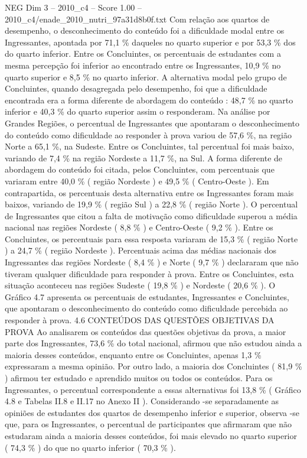 \begin{textsample}{NEG Dim 3 – 2010\_c4 – Score 1.00 – 2010\_c4/enade\_2010\_nutri\_97a31d8b0f.txt}
Com relação aos quartos de desempenho, o desconhecimento do conteúdo foi a dificuldade modal entre os Ingressantes, apontada por 71,1 \% daqueles no quarto superior e por 53,3 \% dos do quarto inferior.
Entre os Concluintes, os percentuais de estudantes com a mesma percepção foi inferior ao encontrado entre os Ingressantes, 10,9 \% no quarto superior e 8,5 \% no quarto inferior.
A alternativa modal pelo grupo de Concluintes, quando desagregada pelo desempenho, foi que a dificuldade encontrada era a forma diferente de abordagem do conteúdo : 48,7 \% no quarto inferior e 40,3 \% do quarto superior assim o responderam.
Na análise por Grandes Regiões, o percentual de Ingressantes que apontaram o desconhecimento do conteúdo como dificuldade ao responder à prova variou de 57,6 \%, na região Norte a 65,1 \%, na Sudeste.
Entre os Concluintes, tal percentual foi mais baixo, variando de 7,4 \% na região Nordeste a 11,7 \%, na Sul.
A forma diferente de abordagem do conteúdo foi citada, pelos Concluintes, com percentuais que variaram entre 40,0 \% ( região Nordeste ) e 49,5 \% ( Centro-Oeste ).
Em contrapartida, os percentuais desta alternativa entre os Ingressantes foram mais baixos, variando de 19,9 \% ( região Sul ) a 22,8 \% ( região Norte ).
O percentual de Ingressantes que citou a falta de motivação como dificuldade superou a média nacional nas regiões Nordeste ( 8,8 \% ) e Centro-Oeste ( 9,2 \% ).
Entre os Concluintes, os percentuais para essa resposta variaram de 15,3 \% ( região Norte ) a 24,7 \% ( região Nordeste ).
Percentuais acima das médias nacionais dos Ingressantes das regiões Nordeste ( 8,4 \% ) e Norte ( 9,7 \% ) declararam que não tiveram qualquer dificuldade para responder à prova.
Entre os Concluintes, esta situação aconteceu nas regiões Sudeste ( 19,8 \% ) e Nordeste ( 20,6 \% ).
O Gráfico 4.7 apresenta os percentuais de estudantes, Ingressantes e Concluintes, que apontaram o desconhecimento do conteúdo como dificuldade percebida ao responder à prova. 4.6 CONTEÚDOS DAS QUESTÕES OBJETIVAS DA PROVA Ao analisarem os conteúdos das questões objetivas da prova, a maior parte dos Ingressantes, 73,6 \% do total nacional, afirmou que não estudou ainda a maioria desses conteúdos, enquanto entre os Concluintes, apenas 1,3 \% expressaram a mesma opinião.
Por outro lado, a maioria dos Concluintes ( 81,9 \% ) afirmou ter estudado e aprendido muitos ou todos os conteúdos.
Para os Ingressantes, o percentual correspondente a essas alternativas foi 13,8 \% ( Gráfico 4.8 e Tabelas II.8 e II.17 no Anexo II ).
Considerando -se separadamente as opiniões de estudantes dos quartos de desempenho inferior e superior, observa -se que, para os Ingressantes, o percentual de participantes que afirmaram que não estudaram ainda a maioria desses conteúdos, foi mais elevado no quarto superior ( 74,3 \% ) do que no quarto inferior ( 70,3 \% ).

\end{textsample}
